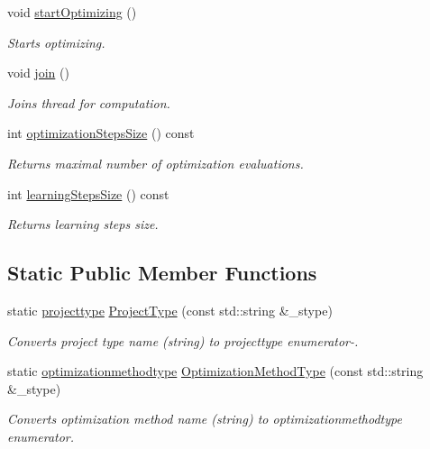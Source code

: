 \begin{DoxyCompactItemize}
void \hyperlink{class_go_s_u_m_1_1_c_container_a0818f57ef8ad54a4576d0fcd0d7da87a}{start\-Optimizing} ()
\begin{DoxyCompactList}\small\item\em Starts optimizing. \end{DoxyCompactList}\item 
void \hyperlink{class_go_s_u_m_1_1_c_container_afffd27d15c55079ec35bfb1e3757ff46}{join} ()
\begin{DoxyCompactList}\small\item\em Joins thread for computation. \end{DoxyCompactList}\item 
int \hyperlink{class_go_s_u_m_1_1_c_container_a109d7994013e7fe0b1efda5853b2b8fd}{optimization\-Steps\-Size} () const 
\begin{DoxyCompactList}\small\item\em Returns maximal number of optimization evaluations. \end{DoxyCompactList}\item 
int \hyperlink{class_go_s_u_m_1_1_c_container_a31d2be2e6e0c6c21e8c66e4bc869da0e}{learning\-Steps\-Size} () const 
\begin{DoxyCompactList}\small\item\em Returns learning steps size. \end{DoxyCompactList}\end{DoxyCompactItemize}
\subsection*{Static Public Member Functions}
\begin{DoxyCompactItemize}
\item 
static \hyperlink{class_go_s_u_m_1_1_c_container_ab98aa1c7c84b62772c0f107a997b5076}{projecttype} \hyperlink{class_go_s_u_m_1_1_c_container_a45a678c04942f1db7a166b54a8f3568c}{Project\-Type} (const std\-::string \&\-\_\-stype)
\begin{DoxyCompactList}\small\item\em Converts project type name (string) to projecttype enumerator-\/. \end{DoxyCompactList}\item 
static \hyperlink{class_go_s_u_m_1_1_c_container_a1bcf4ef46bf23d5c838e8a5c20953e82}{optimizationmethodtype} \hyperlink{class_go_s_u_m_1_1_c_container_a04ec3828254a1619fe9a4009ab769244}{Optimization\-Method\-Type} (const std\-::string \&\-\_\-stype)
\begin{DoxyCompactList}\small\item\em Converts optimization method name (string) to optimizationmethodtype enumerator. \end{DoxyCompactList}\end{DoxyCompactItemize}
